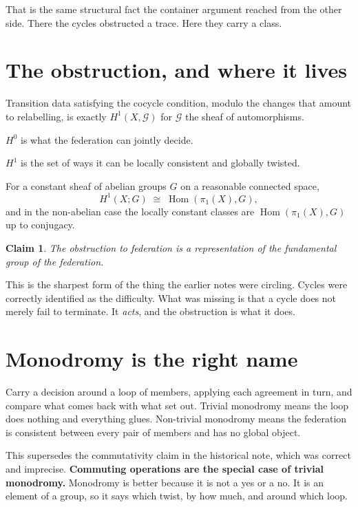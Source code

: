 \documentclass[11pt,a4paper]{article}
\newtheorem{claim}{Claim}
\begin{document}
That is the same structural fact the container argument reached from the other
side. There the cycles obstructed a trace. Here they carry a class.

\section{The obstruction, and where it lives}

Transition data satisfying the cocycle condition, modulo the changes that amount to
relabelling, is exactly $H^1(X, \mathcal{G})$ for $\mathcal{G}$ the sheaf of
automorphisms.

\begin{sectionbox}
$H^0$ is what the federation can jointly decide.

$H^1$ is the set of ways it can be locally consistent and globally twisted.
\end{sectionbox}

For a constant sheaf of abelian groups $G$ on a reasonable connected space,
\[
  H^1(X; G) \;\cong\; \operatorname{Hom}(\pi_1(X), G),
\]
and in the non-abelian case the locally constant classes are
$\operatorname{Hom}(\pi_1(X), G)$ up to conjugacy.

\begin{claim}
The obstruction to federation is a representation of the fundamental group of the
federation.
\end{claim}

This is the sharpest form of the thing the earlier notes were circling. Cycles were
correctly identified as the difficulty. What was missing is that a cycle does not
merely fail to terminate. It \emph{acts}, and the obstruction is what it does.

\section{Monodromy is the right name}

Carry a decision around a loop of members, applying each agreement in turn, and
compare what comes back with what set out. Trivial monodromy means the loop does
nothing and everything glues. Non-trivial monodromy means the federation is
consistent between every pair of members and has no global object.

\begin{sectionbox}
This supersedes the commutativity claim in the historical note, which was correct
and imprecise. \textbf{Commuting operations are the special case of trivial
monodromy.} Monodromy is better because it is not a yes or a no. It is an element
of a group, so it says which twist, by how much, and around which loop.
\end{sectionbox}
\end{document}
